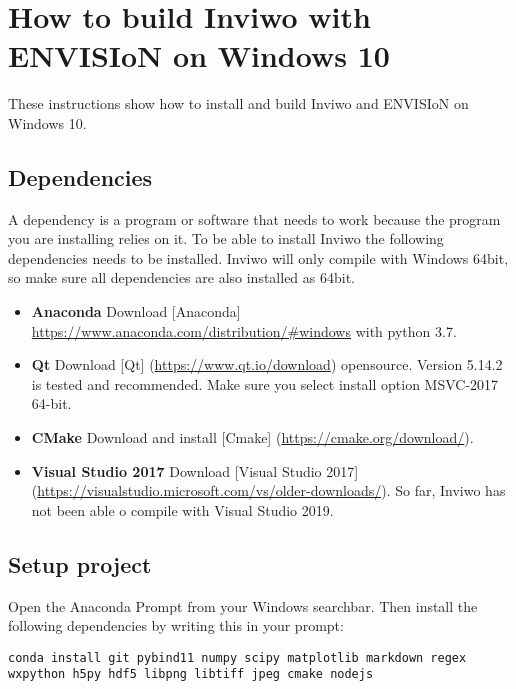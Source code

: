 \section{How to build Inviwo with ENVISIoN on Windows 10}

These instructions show how to install and build Inviwo and ENVISIoN on Windows 10.

\subsection{Dependencies}
A dependency is a program or software that needs to work because the program you are installing relies on it. To be able to install Inviwo the following dependencies needs to be installed. Inviwo will only compile with Windows 64bit, so make sure all dependencies are also installed as 64bit.

\begin{itemize}
    \setlength\itemsep{0.5em}
    \item \textbf{Anaconda}
    \newline Download [Anaconda]
    \url{https://www.anaconda.com/distribution/#windows} with python 3.7.
    \item \textbf{Qt}
    \newline Download [Qt] (\url{https://www.qt.io/download}) opensource. Version 5.14.2 is tested and recommended. Make sure you select install option MSVC-2017 64-bit.
    \item \textbf{CMake}
    \newline Download and install [Cmake] (\url{https://cmake.org/download/}).
    \item \textbf{Visual Studio 2017}
    \newline Download [Visual Studio 2017] (\url{https://visualstudio.microsoft.com/vs/older-downloads/}). So far, Inviwo has not been able o compile with Visual Studio 2019.
\end{itemize}

\subsection{Setup project}
Open the Anaconda Prompt from your Windows searchbar. Then install the following dependencies by writing this in your prompt:

\begin{lstlisting}[frame = single, breaklines=true]
    conda install git pybind11 numpy scipy matplotlib markdown regex wxpython h5py hdf5 libpng libtiff jpeg cmake nodejs
\end{lstlisting}

